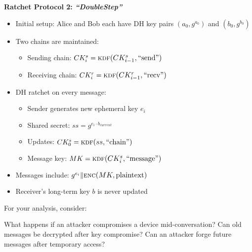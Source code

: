 \documentclass[10pt,a4paper,american]{exam}
\begin{document}
\begin{questions}
\begin{parts}
		\textbf{Ratchet Protocol 2: \textit{``DoubleStep''}}
		\begin{itemize}
			\item Initial setup: Alice and Bob each have DH key pairs $(a_0, g^{a_0})$ and $(b_0, g^{b_0})$
			\item Two chains are maintained:
			      \begin{itemize}
				      \item Sending chain: $CK^s_i = \func{kdf}{CK^s_{i-1}, \text{``send''}}$
				      \item Receiving chain: $CK^r_i = \func{kdf}{CK^r_{i-1}, \text{``recv''}}$
			      \end{itemize}
			\item DH ratchet on every message:
			      \begin{itemize}
				      \item Sender generates new ephemeral key $e_i$
				      \item Shared secret: $ss = g^{e_i \cdot b_{current}}$
				      \item Updates: $CK^s_0 = \func{kdf}{ss, \text{``chain''}}$
				      \item Message key: $MK = \func{kdf}{CK^s_i, \text{``message''}}$
			      \end{itemize}
			\item Messages include: $g^{e_i} \| \func{enc}{MK, \text{plaintext}}$
			\item Receiver's long-term key $b$ is never updated
		\end{itemize}

		For your analysis, consider:
		\begin{subparts}
			\subpart What happens if an attacker compromises a device mid-conversation?
			\subpart Can old messages be decrypted after key compromise?
			\subpart Can an attacker forge future messages after temporary access?
		\end{subparts}
	\end{parts}
\end{questions}
\end{document}
